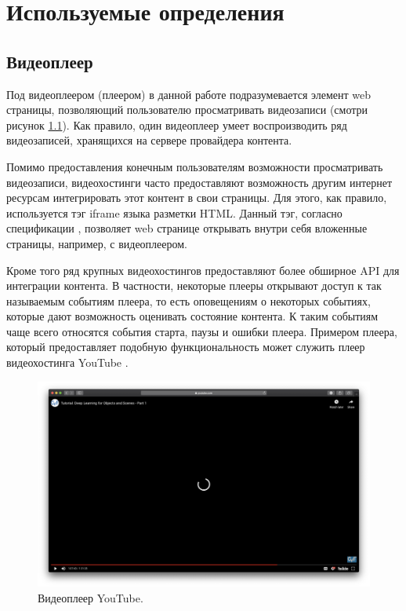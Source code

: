 \chapter{Используемые определения}

\section{Видеоплеер}

Под видеоплеером (плеером) в данной работе подразумевается элемент web страницы, позволяющий пользователю просматривать видеозаписи (смотри рисунок \ref{fig:youtube_good}). Как правило, один видеоплеер умеет воспроизводить ряд видеозаписей, хранящихся на сервере провайдера контента.

Помимо предоставления конечным пользователям возможности просматривать видеозаписи, видеохостинги часто предоставляют возможность другим интернет ресурсам интегрировать этот контент в свои страницы. Для этого, как правило, используется тэг iframe языка разметки HTML. Данный тэг, согласно спецификации \cite{HTML53}, позволяет web странице открывать внутри себя вложенные страницы, например, с видеоплеером.

Кроме того ряд крупных видеохостингов предоставляют более обширное API для интеграции контента. В частности, некоторые плееры открывают доступ к так называемым событиям плеера, то есть оповещениям о некоторых событиях, которые дают возможность оценивать состояние контента. К таким событиям чаще всего относятся события старта, паузы и ошибки плеера. Примером плеера, который предоставляет подобную функциональность может служить плеер видеохостинга YouTube \cite{YouTubeAPI}.

\begin{figure}
    \centering
    \includegraphics[width=\textwidth]{../images/youtube_good.png}
    \caption{Видеоплеер YouTube.}
    \label{fig:youtube_good}
\end{figure}

